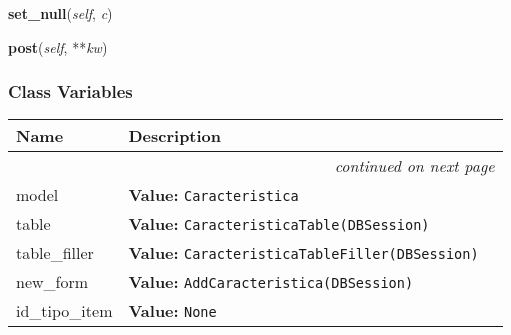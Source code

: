     \vspace{0.5ex}

\hspace{.8\funcindent}\begin{boxedminipage}{\funcwidth}

    \raggedright \textbf{set\_null}(\textit{self}, \textit{c})

\setlength{\parskip}{2ex}
\setlength{\parskip}{1ex}
    \end{boxedminipage}

    \label{saip:controllers:caracteristica_controller:CaracteristicaController:post}

    \vspace{0.5ex}

\hspace{.8\funcindent}\begin{boxedminipage}{\funcwidth}

    \raggedright \textbf{post}(\textit{self}, **\textit{kw})

\setlength{\parskip}{2ex}
\setlength{\parskip}{1ex}
    \end{boxedminipage}



  \subsubsection{Class Variables}

    \vspace{-1cm}
\hspace{\varindent}\begin{longtable}{|p{\varnamewidth}|p{\vardescrwidth}|l}
\cline{1-2}
\cline{1-2} \centering \textbf{Name} & \centering \textbf{Description}& \\
\cline{1-2}
\endhead\cline{1-2}\multicolumn{3}{r}{\small\textit{continued on next page}}\\\endfoot\cline{1-2}
\endlastfoot\raggedright m\-o\-d\-e\-l\- & \raggedright \textbf{Value:} 
{\tt Caracteristica}&\\
\cline{1-2}
\raggedright t\-a\-b\-l\-e\- & \raggedright \textbf{Value:} 
{\tt CaracteristicaTable(DBSession)}&\\
\cline{1-2}
\raggedright t\-a\-b\-l\-e\-\_\-f\-i\-l\-l\-e\-r\- & \raggedright \textbf{Value:} 
{\tt CaracteristicaTableFiller(DBSession)}&\\
\cline{1-2}
\raggedright n\-e\-w\-\_\-f\-o\-r\-m\- & \raggedright \textbf{Value:} 
{\tt AddCaracteristica(DBSession)}&\\
\cline{1-2}
\raggedright i\-d\-\_\-t\-i\-p\-o\-\_\-i\-t\-e\-m\- & \raggedright \textbf{Value:} 
{\tt None}&\\
\cline{1-2}
\end{longtable}

